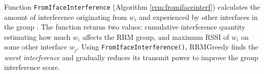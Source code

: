 
Function \texttt{FromIfaceInterference} (Algorithm \ref{rrm:fromifaceinterf}) calculates the amount of interference originating from $w_i$ and experienced by other interfaces in the group \rrmG. The function returns two values: cumulative interference quantity estimating how much $w_i$ affects the RRM group, and maximum RSSI of $w_i$ on some other interface $w_j$. Using \texttt{FromIfaceInterference()}, RRMGreedy finds the \textit{worst interference} and gradually reduces its transmit power to improve the group interference score.

\newcommand{\rrmIface}{interface}
\newcommand{\rrmScandata}{scandata}

